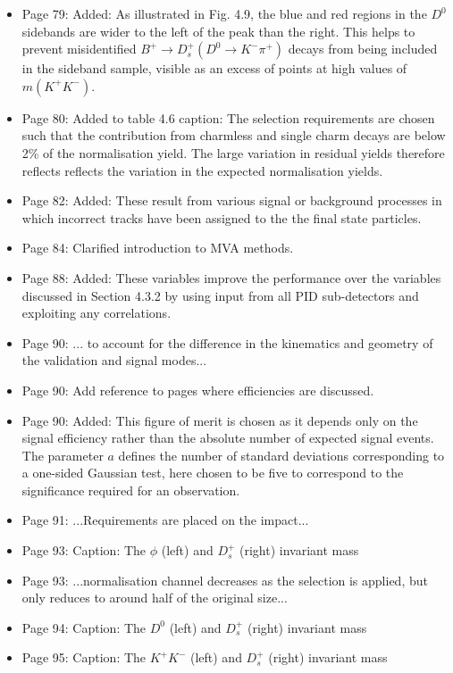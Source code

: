 \documentclass[12pt]{article}
\begin{document}
\begin{itemize}
\item Page 79: Added: {\color{red} As illustrated in Fig. 4.9, the blue and red regions in the $D^0$ sidebands are wider to the left of the peak than the right. This helps to prevent misidentified $B^+\rightarrow D_s^+ (D^0 \rightarrow K^-\pi^+)$ decays from being included in the sideband sample, visible as an excess of points at high values of $m(K^+K^-)$.}
\item Page 80: Added to table 4.6 caption: {\color{red} The selection requirements are chosen such that the contribution from charmless and single charm decays are below 2\% of the normalisation yield. The large variation in residual yields therefore reflects reflects the variation in the expected normalisation yields.}
\item Page 82: Added: {\color{red} These result from various signal or background processes in which incorrect tracks have been assigned to the the final state particles.}
\item Page 84: Clarified introduction to MVA methods.
\item Page 88: Added: {\color{red}These variables improve the performance over the variables discussed in Section 4.3.2 by using input from all PID sub-detectors and exploiting any correlations.}
\item Page 90: ... {\color{red}to account for the difference in the kinematics and geometry of the validation and signal modes}...
\item Page 90: Add reference to pages where efficiencies are discussed.
\item Page 90: Added: {\color{red} This figure of merit is chosen as it depends only on the signal efficiency rather than the absolute number of expected signal events. The parameter $a$ defines the number of standard deviations corresponding to a one-sided Gaussian test, here chosen to be five to correspond to the significance required for an observation.}
\item Page 91: ...Requirements are {\color{red}placed} on the impact... 
\item Page 93: Caption: The {\color{red}$\phi$ (left) and $D_{s}^{+}$ (right)} invariant mass
\item Page 93: ...normalisation channel {\color{red}decreases as the selection is applied, but only reduces to around half of the original size}...
\item Page 94: Caption: The {\color{red}$D^{0}$ (left) and $D_{s}^{+}$ (right)} invariant mass
\item Page 95: Caption: The {\color{red}$K^+K^-$ (left) and $D_{s}^{+}$ (right)} invariant mass


\end{itemize}
\end{document}
